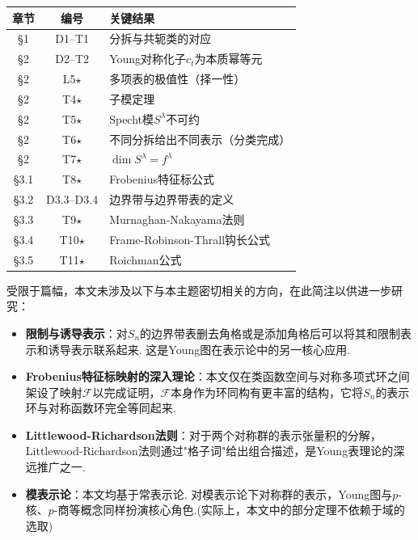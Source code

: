 \documentclass{sjtureport}
\renewcommand{\arraystretch}{1}
\begin{document}
\medskip
{\centering
\renewcommand{\arraystretch}{1.15}
\begin{tabular}{ccl}
    \hline
    章节 & 编号 & 关键结果 \\
    \hline
    \S1&\quad D1--T1 & 分拆与共轭类的对应 \\
    \S2&\quad D2--T2 & Young对称化子$c_t$为本质幂等元 \\
    \S2&\quad L5\;\;$\star$ & 多项表的极值性（择一性） \\
    \S2&\quad T4\;\;$\star$ & 子模定理 \\
    \S2&\quad T5\;\;$\star$ & Specht模$S^\lambda$不可约 \\
    \S2&\quad T6\;\;$\star$ & 不同分拆给出不同表示（分类完成） \\
    \S2&\quad T7\;\;$\star$ & $\dim S^\lambda = f^\lambda$ \\
    \S3.1&\quad T8\;\;$\star$ & Frobenius特征标公式 \\
    \S3.2&\quad D3.3--D3.4 & 边界带与边界带表的定义 \\
    \S3.3&\quad T9\;\;$\star$ & Murnaghan-Nakayama法则 \\
    \S3.4&\quad T10\;\;$\star$ & Frame-Robinson-Thrall钩长公式 \\
    \S3.5&\quad T11\;\;$\star$ & Roichman公式 \\
    \hline
\end{tabular}
\par}

\medskip
受限于篇幅，本文未涉及以下与本主题密切相关的方向，在此简注以供进一步研究：
\begin{itemize}[nosep]
    \item \textbf{限制与诱导表示}：对$S_n$的边界带表删去角格或是添加角格后可以将其和限制表示和诱导表示联系起来. 这是Young图在表示论中的另一核心应用. 
    \item \textbf{Frobenius特征标映射的深入理论}：本文仅在类函数空间与对称多项式环之间架设了映射$\mathcal{F}$以完成证明，$\mathcal{F}$本身作为环同构有更丰富的结构，它将$S_n$的表示环与对称函数环完全等同起来. 
    \item \textbf{Littlewood-Richardson法则}：对于两个对称群的表示张量积的分解，Littlewood-Richardson法则通过"格子词"给出组合描述，是Young表理论的深远推广之一. 
    \item \textbf{模表示论}：本文均基于常表示论. 对模表示论下对称群的表示，Young图与$p$-核、$p$-商等概念同样扮演核心角色.(实际上，本文中的部分定理不依赖于域的选取) 
\end{itemize}
\end{document}
